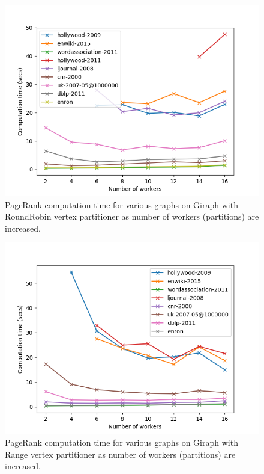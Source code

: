 \begin{figure}[!t]
	\centering
	\includegraphics[width=\columnwidth]{./giraph_roundrobin.png}
    \caption{PageRank computation time for various graphs on Giraph with RoundRobin vertex partitioner
        as number of workers (partitions) are increased.}
	\label{fig:giraph_roundrobin}
\end{figure}

\begin{figure}[!t]
	\centering
	\includegraphics[width=\columnwidth]{./giraph_range.png}
    \caption{PageRank computation time for various graphs on Giraph with Range vertex partitioner
    as number of workers (partitions) are increased.}
	\label{fig:giraph_range}
\end{figure}

